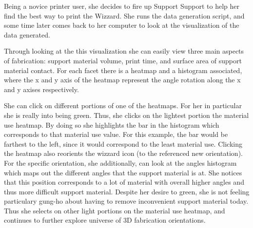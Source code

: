 \documentclass{sigchi}
\begin{document}
Being a novice printer user, she decides to fire up Support Support to help her find the best way to print the Wizzard.  She runs the data generation script, and some time later comes back to her computer to look at the visualization of the data generated.

Through looking at the this visualization she can easily view three main aspects of fabrication: support material volume, print time, and surface area of support material contact. For each facet there is a heatmap and a histogram associated, where the x and y axis of the heatmap represent the angle rotation along the x and y axises respectively.

She can click on different portions of one of the heatmaps. For her in particular she is really into being green. Thus, she clicks on the lightest portion the material use heatmap. By doing so she highlights the bar in the histogram which corresponds to that material use value. For this example, the bar would be farthest to the left, since it would correspond to the least material use. Clicking the heatmap also reorients the wizzard icon (to the referenced new orientation). For the specific orientation, she additionally, can look at the angles histogram which maps out the different angles that the support material is at. She notices that this position corresponds to a lot of material with overall higher angles and thus more difficult support material. Despite her desire to green, she is not feeling particulary gung-ho about having to remove inconvenient support material today. Thus she selects on other light portions on the material use heatmap, and continues to further explore universe of 3D fabrication orientations.
\end{document}
